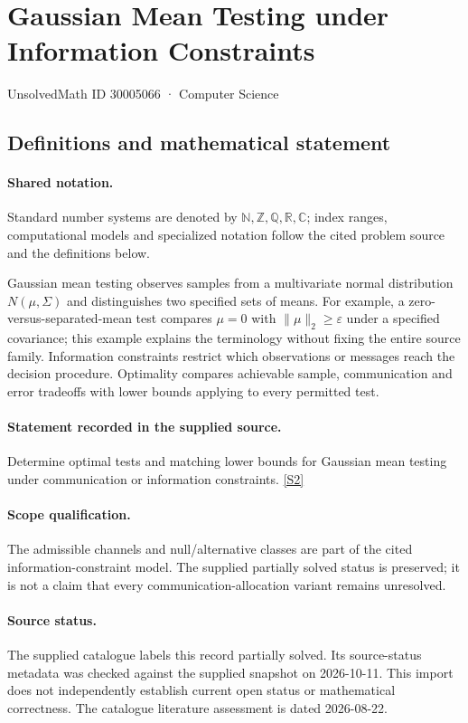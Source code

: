 \documentclass[11pt]{article}
\newcommand{\sref}[2]{\hyperlink{source:#1:#2}{[S#2]}}
\begin{document}
\setcounter{section}{30005065}
\section{Gaussian Mean Testing under Information Constraints}\label{30005066}
{\small\sffamily UnsolvedMath ID 30005066 · Computer Science}
\subsection{Definitions and mathematical statement}

\paragraph{Shared notation.}Standard number systems are denoted by $\mathbb N,\mathbb Z,\mathbb Q,\mathbb R,\mathbb C$; index ranges, computational models and specialized notation follow the cited problem source and the definitions below.


Gaussian mean testing observes samples from a multivariate normal distribution $N(\mu,\Sigma)$ and distinguishes two specified sets of means. For example, a zero-versus-separated-mean test compares $\mu=0$ with $\lVert\mu\rVert_2\geq\varepsilon$ under a specified covariance; this example explains the terminology without fixing the entire source family. Information constraints restrict which observations or messages reach the decision procedure. Optimality compares achievable sample, communication and error tradeoffs with lower bounds applying to every permitted test.
\paragraph{Statement recorded in the supplied source.}
Determine optimal tests and matching lower bounds for Gaussian mean testing under communication or information constraints. \sref{30005066}{2}
\paragraph{Scope qualification.}
The admissible channels and null/alternative classes are part of the cited information-constraint model. The supplied partially solved status is preserved; it is not a claim that every communication-allocation variant remains unresolved.
\paragraph{Source status.}
The supplied catalogue labels this record partially solved. Its source-status metadata was checked against the supplied snapshot on 2026-10-11. This import does not independently establish current open status or mathematical correctness. The catalogue literature assessment is dated 2026-08-22.
\end{document}
